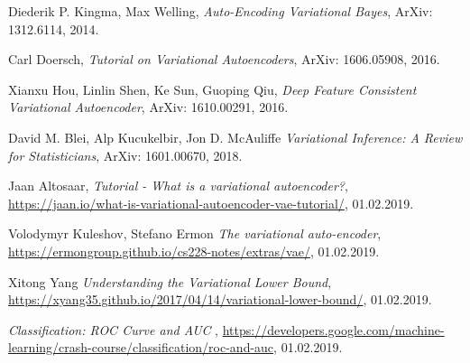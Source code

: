  

\begin{thebibliography}{9}
  
  Diederik P. Kingma, Max Welling,
  \emph{Auto-Encoding Variational Bayes},
  ArXiv: 1312.6114, 
  2014.
  
  Carl Doersch,
  \emph{Tutorial on Variational Autoencoders},
  ArXiv: 1606.05908, 
  2016.
  
  Xianxu Hou, Linlin Shen, Ke Sun, Guoping Qiu,
  \emph{Deep Feature Consistent Variational Autoencoder},
  ArXiv: 1610.00291, 
  2016.
  
  David M. Blei, Alp Kucukelbir, Jon D. McAuliffe
  \emph{Variational Inference: A Review for Statisticians},
  ArXiv: 1601.00670, 
  2018.
  
  Jaan Altosaar,
  \emph{Tutorial - What is a variational autoencoder?},
  \url{https://jaan.io/what-is-variational-autoencoder-vae-tutorial/}, 
  01.02.2019.
  
  Volodymyr Kuleshov, Stefano Ermon
  \emph{The variational auto-encoder},
  \url{https://ermongroup.github.io/cs228-notes/extras/vae/}, 
  01.02.2019.
  
  Xitong Yang
  \emph{Understanding the Variational Lower Bound},
  \url{https://xyang35.github.io/2017/04/14/variational-lower-bound/}, 
  01.02.2019.
  
  \emph{Classification: ROC Curve and AUC },
  \url{https://developers.google.com/machine-learning/crash-course/classification/roc-and-auc}, 
  01.02.2019.

\end{thebibliography}
